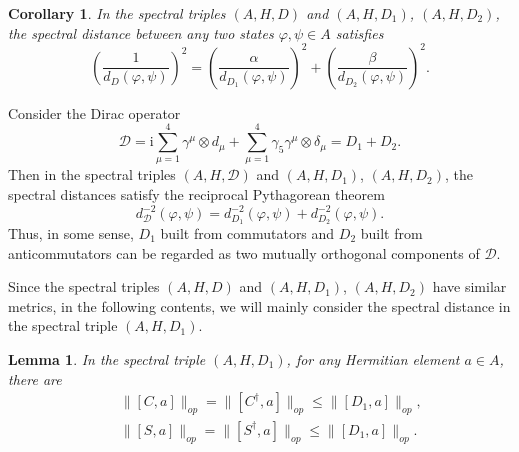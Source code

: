 \documentclass[a4paper,11pt]{article}
\newtheorem{corollary}{Corollary}
\newtheorem{lemma}{Lemma}
\begin{document}
\begin{corollary}
  In the spectral triples $(A, H, D)$ and $(A, H, D_1)$, $(A, H, D_2)$, the
  spectral distance between any two states $\varphi, \psi \in A$ satisfies
  \begin{equation}
    \left( \frac{1}{d_D (\varphi, \psi)} \right)^2 = \left(
    \frac{\alpha}{d_{D_1} (\varphi, \psi)} \right)^2 + \left(
    \frac{\beta}{d_{D_2} (\varphi, \psi)} \right)^2 .
  \end{equation}
\end{corollary}

Consider the Dirac operator
\begin{equation}
  \mathcal{D}= \mathrm{i} \sum_{\mu = 1}^4 \gamma^{\mu} \otimes d_{\mu} + \sum_{\mu =
  1}^4 \gamma_5 \gamma^{\mu} \otimes \delta_{\mu} = D_1 + D_2 .
\end{equation}
Then in the spectral triples $(A, H, \mathcal{D})$ and $(A, H, D_1)$, $(A, H,
D_2)$, the spectral distances satisfy the reciprocal Pythagorean theorem
\begin{equation}
  d_{\mathcal{D}}^{- 2}  (\varphi, \psi) = d_{D_1}^{- 2}  (\varphi, \psi) +
  d_{D_2}^{- 2}  (\varphi, \psi) .
\end{equation}
Thus, in some sense, $D_1$ built from commutators and $D_2$ built from
anticommutators can be regarded as two mutually orthogonal components of $\mathcal{D}$.

Since the spectral triples $(A, H, D)$ and $(A, H, D_1)$, $(A, H, D_2)$ have
similar metrics, in the following contents, we will mainly consider the
spectral distance in the spectral triple $(A, H, D_1)$.

\begin{lemma}
  In the spectral triple $(A, H, D_1)$, for any Hermitian element $a \in A$,
  there are
  \begin{eqnarray}
    &&\|[C, a]\|_{op} = \|[C^{\dag}, a]\|_{op} \leqslant \|[D_1, a]\|_{op},
\nonumber\\
    &&\|[S, a]\|_{op} = \|[S^{\dag}, a]\|_{op} \leqslant \|[D_1, a]\|_{op} .
  \end{eqnarray}
\end{lemma}
\end{document}
